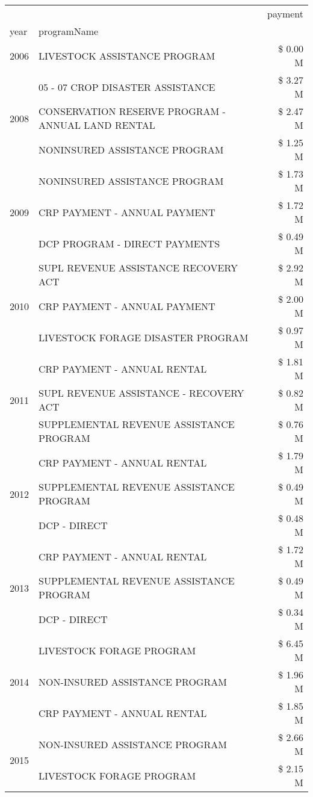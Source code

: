 \begin{tabular}{llr}
\toprule
 &  & payment \\
year & programName &  \\
\midrule
2006 & LIVESTOCK ASSISTANCE PROGRAM & \$ 0.00 M \\
\cline{1-3}
\multirow[t]{3}{*}{2008} & 05 - 07 CROP DISASTER ASSISTANCE & \$ 3.27 M \\
 & CONSERVATION RESERVE PROGRAM - ANNUAL LAND RENTAL & \$ 2.47 M \\
 & NONINSURED ASSISTANCE PROGRAM & \$ 1.25 M \\
\cline{1-3}
\multirow[t]{3}{*}{2009} & NONINSURED ASSISTANCE PROGRAM & \$ 1.73 M \\
 & CRP PAYMENT - ANNUAL PAYMENT & \$ 1.72 M \\
 & DCP PROGRAM - DIRECT PAYMENTS & \$ 0.49 M \\
\cline{1-3}
\multirow[t]{3}{*}{2010} & SUPL REVENUE ASSISTANCE RECOVERY ACT & \$ 2.92 M \\
 & CRP PAYMENT - ANNUAL PAYMENT & \$ 2.00 M \\
 & LIVESTOCK FORAGE DISASTER  PROGRAM & \$ 0.97 M \\
\cline{1-3}
\multirow[t]{3}{*}{2011} & CRP PAYMENT - ANNUAL RENTAL & \$ 1.81 M \\
 & SUPL REVENUE ASSISTANCE - RECOVERY ACT & \$ 0.82 M \\
 & SUPPLEMENTAL REVENUE ASSISTANCE PROGRAM & \$ 0.76 M \\
\cline{1-3}
\multirow[t]{3}{*}{2012} & CRP PAYMENT - ANNUAL RENTAL & \$ 1.79 M \\
 & SUPPLEMENTAL REVENUE ASSISTANCE PROGRAM & \$ 0.49 M \\
 & DCP - DIRECT & \$ 0.48 M \\
\cline{1-3}
\multirow[t]{3}{*}{2013} & CRP PAYMENT - ANNUAL RENTAL & \$ 1.72 M \\
 & SUPPLEMENTAL REVENUE ASSISTANCE PROGRAM & \$ 0.49 M \\
 & DCP - DIRECT & \$ 0.34 M \\
\cline{1-3}
\multirow[t]{3}{*}{2014} & LIVESTOCK FORAGE PROGRAM & \$ 6.45 M \\
 & NON-INSURED ASSISTANCE PROGRAM & \$ 1.96 M \\
 & CRP PAYMENT - ANNUAL RENTAL & \$ 1.85 M \\
\cline{1-3}
\multirow[t]{3}{*}{2015} & NON-INSURED ASSISTANCE PROGRAM & \$ 2.66 M \\
 & LIVESTOCK FORAGE PROGRAM & \$ 2.15 M \\

\end{tabular}
